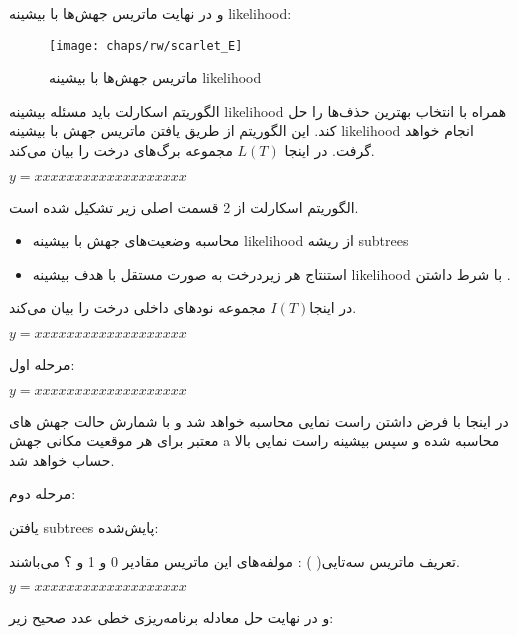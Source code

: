و  در نهایت ماتریس جهش‌ها   با بیشینه \gls{likelihood}: 


\begin{figure}[!ht]
	\centerline{\texttt{[image: chaps/rw/scarlet\_E]}}
	\caption{ماتریس جهش‌ها  با بیشینه \gls{likelihood}}
	\label{fig:ch_rw:scarlet_E}
\end{figure}


الگوریتم اسکارلت باید مسئله بیشینه \gls{likelihood} همراه با  انتخاب بهترین حذف‌ها را حل کند. این الگوریتم از طریق یافتن ماتریس جهش با بیشینه \gls{likelihood}  انجام خواهد گرفت. در اینجا $L(T)$
مجموعه برگ‌های درخت  را بیان می‌کند. 


\begin{math}
	y=xxxxxxxxxxxxxxxxxxx
\end{math}

الگوریتم اسکارلت از 2 قسمت اصلی زیر تشکیل شده است. 

\begin{itemize}
	\item      محاسبه وضعیت‌های جهش با بیشینه \gls{likelihood}  از ریشه \gls{subtrees} 
	\item استنتاج هر زیردرخت به صورت مستقل با هدف بیشینه \gls{likelihood} با شرط داشتن  .
\end{itemize}

در اینجا$I(T)$ مجموعه نودهای داخلی درخت  را بیان می‌کند. 

\begin{math}
	y=xxxxxxxxxxxxxxxxxxx
\end{math}

مرحله اول:

\begin{math}
	y=xxxxxxxxxxxxxxxxxxx
\end{math}


در اینجا با فرض داشتن   راست نمایی محاسبه خواهد شد و    با شمارش حالت جهش های معتبر برای هر موقعیت مکانی جهش a محاسبه شده و سپس بیشینه راست نمایی بالا حساب خواهد شد. 

مرحله دوم:  

یافتن \gls{subtrees} پایش‌شده: 

تعریف ماتریس سه‌تایی( ) : مولفه‌های این ماتریس مقادیر 0 و 1 و ؟ می‌باشند.

\begin{math}
	y=xxxxxxxxxxxxxxxxxxx
\end{math}

و در نهایت حل معادله برنامه‌ریزی خطی عدد صحیح زیر: 


